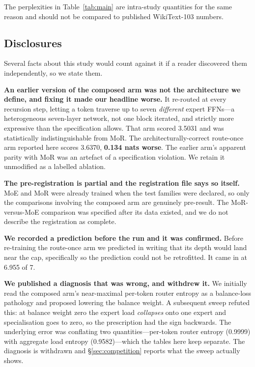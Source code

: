 The perplexities in Table~\ref{tab:main} are intra-study quantities for the same
reason and should not be compared to published WikiText-103 numbers.

\subsection{Disclosures}
\label{sec:honesty}

Several facts about this study would count against it if a reader discovered them
independently, so we state them.

\textbf{An earlier version of the composed arm was not the architecture we define,
and fixing it made our headline worse.} It re-routed at every recursion step,
letting a token traverse up to seven \emph{different} expert FFNs---a heterogeneous
seven-layer network, not one block iterated, and strictly more expressive than the
specification allows. That arm scored 3.5031 and was statistically indistinguishable
from MoR. The architecturally-correct route-once arm reported here scores 3.6370,
\textbf{0.134 nats worse}. The earlier arm's apparent parity with MoR was an
artefact of a specification violation. We retain it unmodified as a labelled
ablation.

\textbf{The pre-registration is partial and the registration file says so itself.}
MoE and MoR were already trained when the test families were declared, so only the
comparisons involving the composed arm are genuinely pre-result. The MoR-versus-MoE
comparison was specified after its data existed, and we do not describe the
registration as complete.

\textbf{We recorded a prediction before the run and it was confirmed.} Before
re-training the route-once arm we predicted in writing that its depth would land
near the cap, specifically so the prediction could not be retrofitted. It came in
at 6.955 of 7.

\textbf{We published a diagnosis that was wrong, and withdrew it.} We initially
read the composed arm's near-maximal per-token router entropy as a balance-loss
pathology and proposed lowering the balance weight. A subsequent sweep refuted
this: at balance weight zero the expert load \emph{collapses} onto one expert and
specialisation goes to zero, so the prescription had the sign backwards. The
underlying error was conflating two quantities---per-token router entropy (0.9999)
with aggregate load entropy (0.9582)---which the tables here keep separate. The
diagnosis is withdrawn and \S\ref{sec:competition} reports what the sweep actually
shows.

